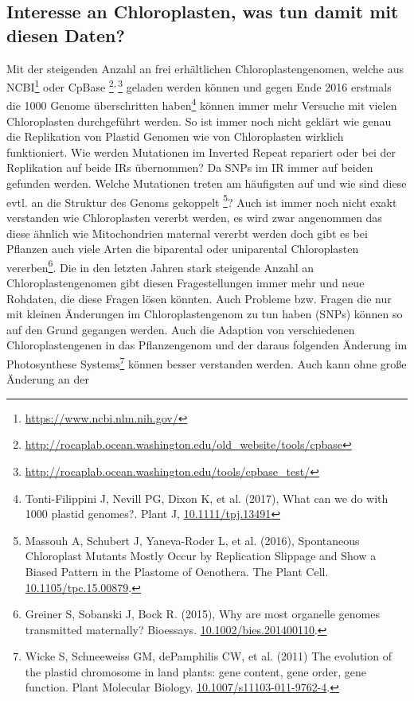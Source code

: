 \documentclass{scrartcl}
\begin{document}
\subsection{Interesse an Chloroplasten, was tun damit mit diesen Daten?}
\label{sec-2-6}
Mit der steigenden Anzahl an frei erhältlichen Chloroplastengenomen, welche aus NCBI\footnote{\url{https://www.ncbi.nlm.nih.gov/}} oder CpBase \footnote{\url{http://rocaplab.ocean.washington.edu/old_website/tools/cpbase}}\textsuperscript{,}\,\footnote{\url{http://rocaplab.ocean.washington.edu/tools/cpbase_test/}} geladen werden können und gegen Ende 2016 erstmals die 1000 Genome überschritten haben\footnote{Tonti-Filippini J, Nevill PG, Dixon K, et al. (2017), What can we do with 1000 plastid genomes?. Plant J, \url{10.1111/tpj.13491}} können immer mehr Versuche mit vielen Chloroplasten durchgeführt werden.
So ist immer noch nicht geklärt wie genau die Replikation von Plastid Genomen wie von Chloroplasten wirklich funktioniert. Wie werden Mutationen im Inverted Repeat repariert oder bei der Replikation auf beide IRs übernommen?
Da SNPs im IR immer auf beiden gefunden werden. Welche Mutationen treten am häufigsten auf und wie sind diese evtl. an die Struktur des Genoms gekoppelt \footnote{Massouh A, Schubert J, Yaneva-Roder L, et al. (2016), Spontaneous Chloroplast Mutants Mostly Occur by Replication Slippage and Show a Biased Pattern in the Plastome of Oenothera. The Plant Cell. \url{10.1105/tpc.15.00879}.}? Auch ist immer noch nicht exakt verstanden wie Chloroplasten
vererbt werden, es wird zwar angenommen das diese ähnlich wie Mitochondrien maternal vererbt werden doch gibt es bei Pflanzen auch viele Arten die biparental oder uniparental Chloroplasten vererben\footnote{Greiner S, Sobanski J, Bock R. (2015), Why are most organelle genomes transmitted maternally? Bioessays. \url{10.1002/bies.201400110}.}. Die in den letzten 
Jahren stark steigende Anzahl an Chloroplastengenomen gibt diesen Fragestellungen immer mehr und neue Rohdaten, die diese Fragen lösen könnten. Auch Probleme bzw. Fragen die nur mit kleinen Änderungen im Chloroplastengenom zu tun 
haben (SNPs) können so auf den Grund gegangen werden. Auch die Adaption von verschiedenen Chloroplastengenen in das Pflanzengenom und der daraus folgenden Änderung im Photosynthese Systems\footnote{Wicke S, Schneeweiss GM, dePamphilis CW, et al. (2011) The evolution of the plastid chromosome in land plants: gene content, gene order, gene function. Plant Molecular Biology.  \url{10.1007/s11103-011-9762-4}.} können besser verstanden werden. Auch kann ohne große Änderung an der
\end{document}
